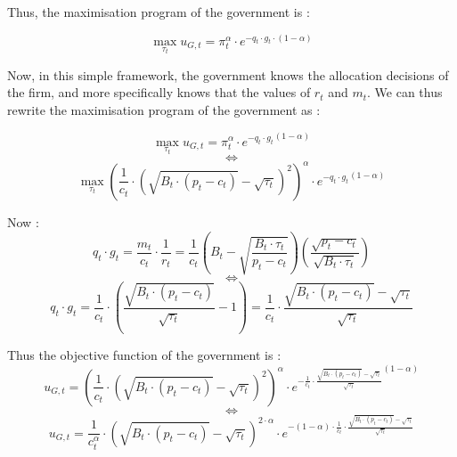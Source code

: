 \documentclass{article}
\begin{document}
Thus, the maximisation program of the government is : 

\begin{equation*}
    \max_{\tau_{t}}{u_{G,t}=\pi_{t}^{\alpha}\cdot e^{-q_{t}\cdot g_{t}\cdot(1-\alpha)}}
\end{equation*}

Now, in this simple framework, the government knows the allocation decisions of the firm, and more specifically knows that the values of $r_{t}$ and $m_{t}$. We can thus rewrite the maximisation program of the government as : 

$$
    \max_{\tau_{t}}{u_{G,t}=\pi_{t}^{\alpha}\cdot {e^{-q_{t}\cdot g_{t}}}^{(1-\alpha)}}
$$
$$\iff$$
$$\max_{\tau_{t}}{\left(\frac{1}{c_{t}}\cdot\left({\sqrt{B_{t}\cdot (p_{t}-c_{t})}-\sqrt{\tau_{t}}}\right)^{2}\right)^{\alpha}\cdot {e^{-q_{t}\cdot g_{t}}}^{(1-\alpha)}}$$

Now : 
$$q_{t}\cdot g_{t}=\frac{m_{t}}{c_{t}}\cdot\frac{1}{r_{t}}=\frac{1}{c_{t}}\left(B_{t}-\sqrt{\frac{B_{t}\cdot \tau_{t}}{p_{t}-c_{t}}}\right)\left(\frac{\sqrt{p_{t}-c_{t}}}{\sqrt{B_{t}\cdot \tau_{t}}}\right)$$
$$\iff$$
$$q_{t}\cdot g_{t}=\frac{1}{c_{t}}\cdot \left(\frac{\sqrt{B_{t}\cdot(p_{t}-c_{t})}}{\sqrt{\tau_{t}}}-1\right)=\frac{1}{c_{t}}\cdot \frac{\sqrt{B_{t}\cdot(p_{t}-c_{t})}-\sqrt{\tau_{t}}}{\sqrt{\tau_{t}}}$$

Thus the objective function of the government is : 
$${u_{G,t}=\left(\frac{1}{c_{t}}\cdot\left({\sqrt{B_{t}\cdot (p_{t}-c_{t})}-\sqrt{\tau_{t}}}\right)^{2}\right)^{\alpha}\cdot {e^{-\frac{1}{c_{t}}\cdot \frac{\sqrt{B_{t}\cdot(p_{t}-c_{t})}-\sqrt{\tau_{t}}}{\sqrt{\tau_{t}}}}}^{(1-\alpha)}}$$
$$\iff$$
$${u_{G,t}=\frac{1}{c_{t}^\alpha}\cdot\left({\sqrt{B_{t}\cdot (p_{t}-c_{t})}-\sqrt{\tau_{t}}}\right)^{2\cdot\alpha}\cdot {e^{-(1-\alpha)\cdot\frac{1}{c_{t}}\cdot \frac{\sqrt{B_{t}\cdot(p_{t}-c_{t})}-\sqrt{\tau_{t}}}{\sqrt{\tau_{t}}}}}}$$
\end{document}
